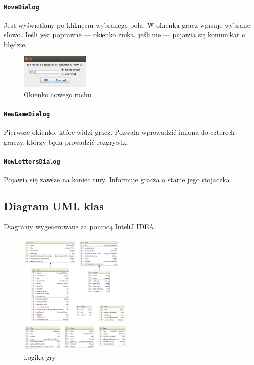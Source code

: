 \documentclass[a4paper]{article}
\begin{document}
\paragraph{\texttt{MoveDialog}} Jest wyświetlany po kliknęciu wybranego pola. W okienku gracz wpisuje wybrane słowo.
Jeśli jest poprawne --- okienko znika, jeśli nie --- pojawia się komunikat o błędzie.

\begin{figure}[!ht]
\centering
\includegraphics[width=0.3\textwidth]{4.png}
\caption{Okienko nowego ruchu}
\end{figure}

\paragraph{\texttt{NewGameDialog}} Pierwsze okienko, które widzi gracz.
Pozwala wprowadzić imiona do czterech graczy, którzy będą prowadzić rozgrywkę.

\paragraph{\texttt{NewLettersDialog}} Pojawia się zawsze na koniec tury. Informuje gracza o stanie jego stojaczka.

\newpage
\subsection{Diagram UML klas}
Diagramy wygenerowane za pomocą InteliJ IDEA.

\begin{figure}[ht]
\centering
\includegraphics[width=0.5\textwidth]{logika.png}
\caption{Logika gry}
\end{figure}
\end{document}
